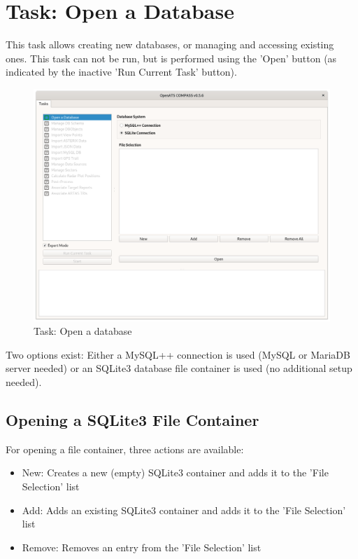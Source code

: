 \section{Task: Open a Database}
\label{sec:task_open_database}

This task allows creating new databases, or managing and accessing existing ones. This task can not be run, but is performed using the 'Open' button (as indicated by the inactive 'Run Current Task' button).

\begin{figure}[H]
  \hspace*{-2.5cm}
    \includegraphics[width=19cm]{figures/task_open_database.png}
  \caption{Task: Open a database}
\end{figure}

Two options exist: Either a MySQL++ connection is used (MySQL or MariaDB server needed) or an SQLite3 database file container is used (no additional setup needed).

\subsection{Opening a SQLite3 File Container}
\label{sec:sqlite_open}
For opening a file container, three actions are available:

\begin{itemize}  
\item New: Creates a new (empty) SQLite3 container and adds it to the 'File Selection' list
\item Add: Adds an existing  SQLite3 container and adds it to the 'File Selection' list
\item Remove: Removes an entry from the 'File Selection' list
\end{itemize}

